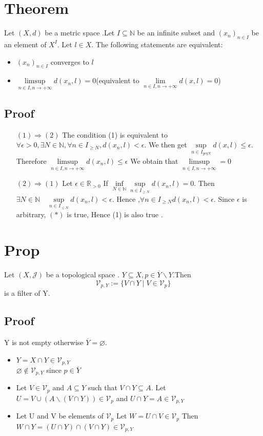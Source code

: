 \documentclass{book}
\begin{document}
\section{Theorem}
Let $(X,d)$ be a metric space .Let $I\subseteq \mathbb{N} $ be an infinite subset and $(x_n)_{n\in I}$ be an element of $X^I$. Let $l\in X$. The following statements are equivalent:
\begin{itemize}
    \item $(x_n)_{n\in I}$ converges to $l$
    \item $\limsup\limits_{n\in I,n\rightarrow+\infty}d(x_n,l)=0$(equivalent to $\lim\limits_{n\in I,n\rightarrow+\infty}d(x,l)=0$)
\end{itemize}
\subsection*{Proof}
\begin{itemize}
    \item [$(1)\Rightarrow(2)$]The condition (1) is equivalent to $\forall \epsilon>0,\exists N\in \mathbb{N} ,\forall n\in I_{\geq N},d(x_n,l)<\epsilon$. We then get $\sup\limits_{n\in I_{geq N}}d(x,l)\leq \epsilon$. Therefore $\limsup\limits_{n\in I,n\rightarrow+\infty}d(x_n,l)\leq \epsilon$ We obtain that $\limsup\limits_{n\in I,n\rightarrow+\infty}=0$
    \item [$(2)\Rightarrow(1)$]Let $\epsilon\in \mathbb{R} _{>0}$ If $\inf\limits_{N\in \mathbb{N} }\sup\limits_{n\in I_{\geq N}}d(x_n,l)=0$. Then $\exists N\in \mathbb{N} \quad\sup\limits_{n\in I_{\leq N}}d(x_n,l)<\epsilon.$ Hence ,$\forall n \in I_{\geq N}d(x_n,l)<\epsilon$. Since $\epsilon$ is arbitrary, $(*)$ is true, Hence (1) is also true .
\end{itemize}
\section{Prop}
 Let $(X,\mathcal{J})$ be a topological space . $Y\subseteq X, p\in \overline{Y}\backslash Y.$Then $$\mathcal{V}_{p,Y}:=\{V\cap Y\mid V\in \mathcal{V}_p\}$$ is a filter of Y.
\subsection*{Proof}
Y is not empty otherwise $\overline{Y}=\varnothing$. 
\begin{itemize}
    \item $Y=X\cap Y\in \mathcal{V}_{p,Y}$
    \\ $\varnothing\not\in \mathcal{V}_{p,Y}$ since $p\in \overline{Y}$
    \item Let $V\in\mathcal{V}_p$ and $A\subseteq Y$ such that $V\cap Y\subseteq A$. Let $U=V\cup(A\backslash (V\cap Y))\in \mathcal{V}_p$ and $ U\cap Y= A\in\mathcal{V}_{p,Y}$
    \item Let U and V be elements of $\mathcal{V}_p$ Let $W=U\cap V\in \mathcal{V}_p$ Then $W\cap Y=(U\cap Y)\cap(V\cap Y)\in \mathcal{V}_{p,Y}$
\end{itemize}
\end{document}
